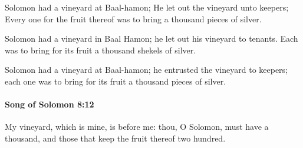 			\begin{versebox}
					\item[BHS] 
					\item[LXX] 
					\item[ASV] Solomon had a vineyard at Baal-hamon; He let out the vineyard unto keepers; Every one for the fruit thereof was to bring a thousand pieces of silver.
					\item[NIV] Solomon had a vineyard in Baal Hamon; he let out his vineyard to tenants. Each was to bring for its fruit a thousand shekels of silver.
					\item[NRSV] Solomon had a vineyard at Baal-hamon; he entrusted the vineyard to keepers; each one was to bring for its fruit a thousand pieces of silver.
			\end{versebox}

		\paragraph{Song of Solomon 8:12} %
			\label{SONGOFSOLOMON-8-12}

			My vineyard, which is mine, is before me: thou, O Solomon, must have a thousand, and those that keep the fruit thereof two hundred.

